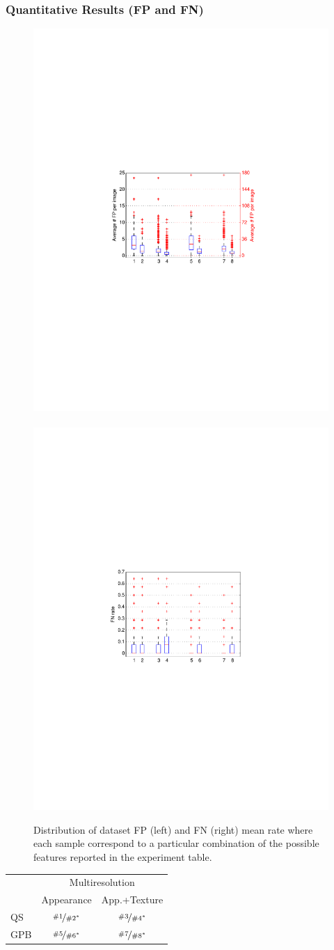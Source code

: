 \begin{frame}\frametitle{Quantitative Results (FP and FN)}
\begin{figure}[Htbp]
\centering
\includegraphics[trim = 160 305 155 295, clip,width=.52\textwidth]{fp}~ 
\includegraphics[trim = 160 305 158 295, clip,width=.52\textwidth]{fn}
\caption{Distribution of dataset FP (left) and FN (right) mean rate where each sample correspond to a particular combination of the possible features reported in the experiment table. }
\label{fig:quantResultsAOV}
\end{figure}
\vspace{-15pt}
\centering
{\tiny {}
\begin{tabular}{l|c|c|}
\multicolumn{1}{c}{}&\multicolumn{2}{c}{Multiresolution} \\ \cmidrule{2-3}
	& Appearance & App.+Texture \\ \hline
QS	& $\nicefrac{\#1}{\#2^*}$ & $\nicefrac{\#3}{\#4^*}$ \\ \hline
GPB & $\nicefrac{\#5}{\#6^*}$ & $\nicefrac{\#7}{\#8^*}$ \\ \hline
\end{tabular}}
\end{frame}


